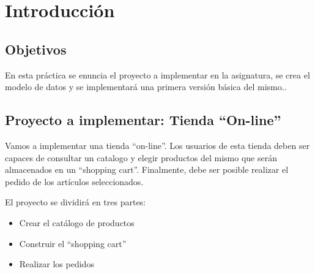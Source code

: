 \documentclass[12pt]{article} %
\begin{document}

\tableofcontents %

\newpage %


\section {Introducción}

\subsection{Objetivos} %
En esta práctica se enuncia el proyecto a implementar en la asignatura, se crea el modelo de datos y se implementará una primera versión básica del mismo..

\subsection{Proyecto a implementar: Tienda ``On-line''} %
Vamos a implementar una tienda ``on-line''. Los usuarios de esta tienda deben ser capaces de consultar un catalogo y elegir productos del mismo que serán almacenados en un ``shopping cart''. Finalmente, debe ser posible realizar el pedido de los artículos seleccionados.

El proyecto se dividirá en tres partes: 

\begin{itemize}
 \item Crear el catálogo de productos
 \item Construir el ``shopping cart''
 \item Realizar los pedidos
\end{itemize}
\end{document}
